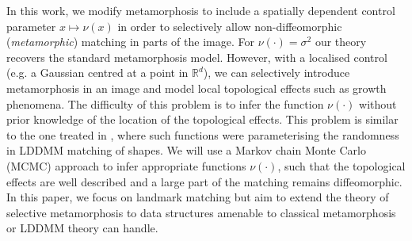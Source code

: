\documentclass[runningheads]{llncs}
\newcommand{\Rd}{\mathbb{R}^{d}}
\begin{document}
In this work, we modify metamorphosis to include a spatially dependent control
parameter $x\mapsto\nu(x)$ in order to selectively allow non-diffeomorphic
(\emph{metamorphic}) matching in parts of the image. For $\nu(\cdot) = \sigma^2$
our theory recovers the standard metamorphosis model. However, with a localised
control (e.g. a Gaussian centred at a point in $\Rd$), we can selectively
introduce metamorphosis in an image and model local topological effects such as
growth phenomena. The difficulty of this problem is to infer the function
$\nu(\cdot)$ without prior knowledge of the location of the topological effects.
This problem is similar to the one treated in \cite{arnaudon_geometric_2017},
where such functions were parameterising the randomness in LDDMM matching of
shapes.  We will use a Markov chain Monte Carlo (MCMC) approach to infer
appropriate functions $\nu(\cdot)$, such that the topological effects are well
described and a large part of the matching remains diffeomorphic. In this paper,
we focus on landmark matching but aim to extend the theory of selective
metamorphosis to data structures amenable to classical metamorphosis or LDDMM
theory can handle.\\
\end{document}
